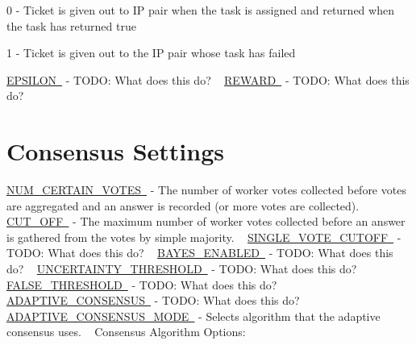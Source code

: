 \begin{DoxyItemize}
\item 0 -\/ Ticket is given out to IP pair when the task is assigned and returned when the task has returned true
\item 1 -\/ Ticket is given out to the IP pair whose task has failed
\end{DoxyItemize}

\mbox{\hyperlink{namespacedynamicfilterapp_1_1toggles_a5f5369d7244632ac071379fbb460c8fe}{E\+P\+S\+I\+L\+ON }} -\/ T\+O\+DO\+: What does this do? ~\newline
 \mbox{\hyperlink{namespacedynamicfilterapp_1_1toggles_a058a8495c920cb75e731931532524c19}{R\+E\+W\+A\+RD }} -\/ T\+O\+DO\+: What does this do? ~\newline
 \hypertarget{toggles_voteGetting}{}\section{Consensus Settings}\label{toggles_voteGetting}
\mbox{\hyperlink{namespacedynamicfilterapp_1_1toggles_a157bc167f366f75c9ba8d3e36e8d8540}{N\+U\+M\+\_\+\+C\+E\+R\+T\+A\+I\+N\+\_\+\+V\+O\+T\+ES }} -\/ The number of worker votes collected before votes are aggregated and an answer is recorded (or more votes are collected). ~\newline
 \mbox{\hyperlink{namespacedynamicfilterapp_1_1toggles_a914791c176a78c026dc76a18bcd88d73}{C\+U\+T\+\_\+\+O\+FF }} -\/ The maximum number of worker votes collected before an answer is gathered from the votes by simple majority. ~\newline
 \mbox{\hyperlink{namespacedynamicfilterapp_1_1toggles_afa8e106b735033b706b1412e12f6783b}{S\+I\+N\+G\+L\+E\+\_\+\+V\+O\+T\+E\+\_\+\+C\+U\+T\+O\+FF }} -\/ T\+O\+DO\+: What does this do? ~\newline
 \mbox{\hyperlink{namespacedynamicfilterapp_1_1toggles_adadcb301c2f0066591eaf0a4c08ac96d}{B\+A\+Y\+E\+S\+\_\+\+E\+N\+A\+B\+L\+ED }} -\/ T\+O\+DO\+: What does this do? ~\newline
 \mbox{\hyperlink{namespacedynamicfilterapp_1_1toggles_aaefdc27b85545eb4a910f5c65f7d8bbb}{U\+N\+C\+E\+R\+T\+A\+I\+N\+T\+Y\+\_\+\+T\+H\+R\+E\+S\+H\+O\+LD }} -\/ T\+O\+DO\+: What does this do? ~\newline
 \mbox{\hyperlink{namespacedynamicfilterapp_1_1toggles_a31317fa26792fa204392549329cc31cb}{F\+A\+L\+S\+E\+\_\+\+T\+H\+R\+E\+S\+H\+O\+LD }} -\/ T\+O\+DO\+: What does this do? ~\newline
 \mbox{\hyperlink{namespacedynamicfilterapp_1_1toggles_a7b6800fe9bb5df8c84060ed96d9711ac}{A\+D\+A\+P\+T\+I\+V\+E\+\_\+\+C\+O\+N\+S\+E\+N\+S\+US }} -\/ T\+O\+DO\+: What does this do? ~\newline
 \mbox{\hyperlink{namespacedynamicfilterapp_1_1toggles_a394fa3f8531c2ecc987f982367a4af2d}{A\+D\+A\+P\+T\+I\+V\+E\+\_\+\+C\+O\+N\+S\+E\+N\+S\+U\+S\+\_\+\+M\+O\+DE }} -\/ Selects algorithm that the adaptive consensus uses. ~\newline
 Consensus Algorithm Options\+: ~\newline

